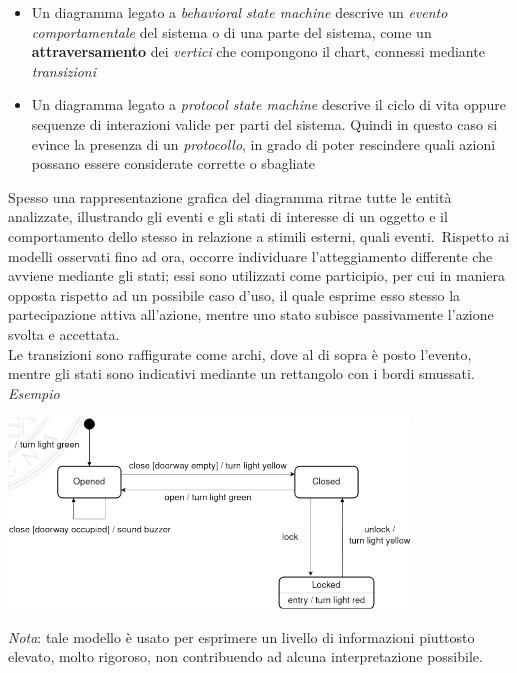 \documentclass{article}
\begin{document}
\begin{itemize}[label={-}]
    \itemsep0em
    \item Un diagramma legato a \textit{behavioral state machine} descrive un \textit{evento comportamentale} del sistema o di una parte del sistema, come un \textbf{attraversamento} dei \textit{vertici} che compongono il chart, connessi mediante \textit{transizioni} 
    \item Un diagramma legato a \textit{protocol state machine} descrive il ciclo di vita oppure sequenze di interazioni valide per parti del sistema. Quindi in questo caso si evince la presenza di un \textit{protocollo}, in grado di poter rescindere quali azioni possano essere considerate corrette o sbagliate
\end{itemize}
Spesso una rappresentazione grafica del diagramma ritrae tutte le entità analizzate, illustrando gli eventi e gli stati di interesse di un oggetto e il comportamento dello stesso in relazione a stimili esterni, quali eventi.\ Rispetto ai modelli osservati fino ad ora, occorre individuare l'atteggiamento differente che avviene mediante gli stati; essi sono utilizzati come participio, per cui in maniera opposta rispetto ad un possibile caso d'uso, il quale esprime esso stesso la partecipazione attiva all'azione, mentre uno stato subisce passivamente l'azione svolta e accettata.\\Le transizioni sono raffigurate come archi, dove al di sopra è posto l'evento, mentre gli stati sono indicativi mediante un rettangolo con i bordi smussati.\vspace*{14pt}\\
\textit{Esempio}\vspace*{14pt}
\begin{center}
    \includegraphics[width=0.8\textwidth]{foto 1.png}
\end{center}
\textit{Nota}: tale modello è usato per esprimere un livello di informazioni piuttosto elevato, molto rigoroso, non contribuendo ad alcuna interpretazione possibile.\vspace*{14pt}\\
\end{document}
